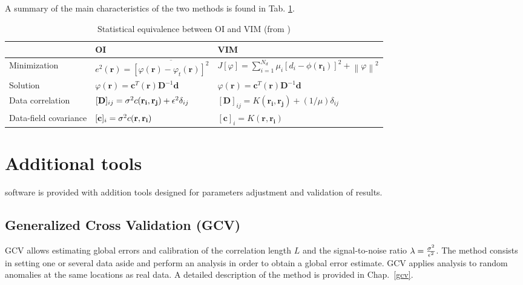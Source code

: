A summary of the main characteristics of the two methods is found in Tab. \ref{tabOAVIM}.


\begin{table}[H]
\begin{flushleft}
\caption{Statistical equivalence between OI and VIM (from \cite{RIXEN00})\label{tabOAVIM}}
\begin{tabular}{lll}
\hline
											&		OI																																										  	&VIM \\
											\hline
Minimization \rule{0pt}{3ex}& $e^{2}(\mathbf{r})= \overline{ [\varphi(\mathbf{r})-\varphi_{t}(\mathbf{r})]^{2}}$					& $J[\varphi]=\sum_{i=1}^{N_d}\mu_{i}[d_{i}-\phi(\mathbf{r_{i}})]^{2}+\left\|\varphi\right\|^{2}$\\
Solution							& $\varphi(\mathbf{r})= \mathbf{c}^{T}(\mathbf{r})\mathbf{D}^{-1}\mathbf{d}$								& $\varphi(\mathbf{r})= \mathbf{c}^{T}(\mathbf{r})\mathbf{D}^{-1}\mathbf{d}$	\\
Data correlation			& $[\mathbf{D}]_{ij}=\sigma^{2} c(\mathbf{r_{i}},\mathbf{r_{j}})+\epsilon^{2}\delta_{ij}$	& $[\mathbf{D}]_{ij}=K(\mathbf{r_i},\mathbf{r_j})+(1/\mu)\delta_{ij}$\\
Data-field covariance & $[\mathbf{c}]_{i}=\sigma^{2} c(\mathbf{r},\mathbf{r_{i}})$																						& $[\mathbf{c}]_{i}=K(\mathbf{r},\mathbf{r_{i}})$	\\
\hline
\end{tabular}
\end{flushleft}
\end{table}



\section{Additional tools}

\diva software is provided with addition tools designed for parameters adjustment and validation of results.


\subsection{Generalized Cross Validation (GCV)\label{firsttool}}

GCV allows estimating global errors and calibration of the correlation length $L$ and the signal-to-noise ratio $\lambda=\frac{\sigma^{2}}{\epsilon^{2}}$.
The method consists in setting one or several data aside and perform an analysis in order to obtain a global error estimate. GCV applies analysis to random anomalies at the same locations as real data. A detailed description of the method is provided in Chap.~\ref{gcv}.

